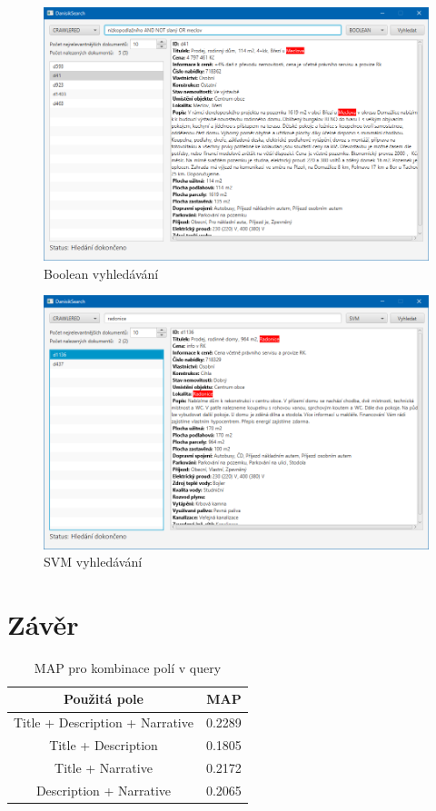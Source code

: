 \documentclass[12pt, a4paper]{article}
\begin{document}
\begin{figure}[h]
	\centering
	\includegraphics[width=15cm]{img/search_boolean.png}
	\caption{Boolean vyhledávání}
	\label{fig:search_boolean}
\end{figure}

\begin{figure}[h]
	\centering
	\includegraphics[width=15cm]{img/search_svm.png}
	\caption{SVM vyhledávání}
	\label{fig:search_svm}
\end{figure}

\newpage

\section{Závěr}

\begin{table}[h!]
  \begin{center}

\begin{tabular}{| c |c |}
\hline
  \textbf{Použitá pole} & \textbf{MAP}\\
\hline
Title + Description + Narrative & 0.2289\\
\hline
Title + Description & 0.1805\\
\hline
Title + Narrative & 0.2172\\
\hline
Description + Narrative & 0.2065\\
\hline
\end{tabular}
\end{center}
	\caption{MAP pro kombinace polí v query}
	\label{fig:map_combination}
\end{table}
\end{document}
